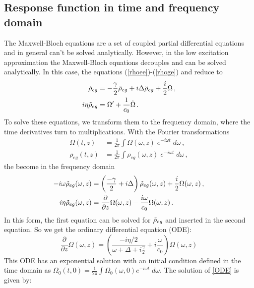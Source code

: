 \subsection{Response function in time and frequency domain}\label{section_respfunction}
The Maxwell-Bloch equations are a set of coupled partial differential equations and in general can't be solved analytically. However, in the low excitation approximation the Maxwell-Bloch equations decouples and can be solved analytically. In this case, the equations (\ref{rhoee})-(\ref{rhoge}) and  reduce to
\begin{align}
    \dot{\rho}_{eg} &= -\frac{\gamma}{2} \Tilde{\rho}_{eg} + i\Delta \Tilde{\rho}_{eg} + \frac{i}{2} \Omega \, , \label{rhoegpre}\\
    i\eta \Tilde{\rho}_{eg} &= \Omega' + \frac{1}{c_0} \dot{\Omega} \, .\label{Omegapre}
\end{align}
To solve these equations, we transform them to the frequency domain, where the time derivatives turn to multiplications. With the Fourier transformations
\begin{align}
    \Omega(t,z) &= \frac{1}{2\pi} \int \Omega(\omega,z)\; e^{-i\omega t} \;d\omega \, , \label{fourierdef}\\
    \rho_{eg}(t,z) &= \frac{1}{2\pi} \int \rho_{eg}(\omega,z)\; e^{-i\omega t}\; d\omega\, ,
\end{align}
the  become in the frequency domain
\begin{align}
    -i\omega \Tilde{\rho}_{eg}(\omega, z) &= \left(\frac{-\gamma}{2} + i\Delta \right)\Tilde{\rho}_{eg} (\omega,z) + \frac{i}{2} \Omega(\omega, z) \label{timerhoegpre}\, , \\
    i\eta \Tilde{\rho}_{eg}(\omega, z) &= \frac{\partial}{\partial z} \Omega(\omega, z) - \frac{i\omega}{c_0} \Omega(\omega, z) \, .\label{timeomegapre}
\end{align}
In this form, the first equation can be solved for $\Tilde{\rho}_{eg}$ and inserted in the second equation. So we get the ordinary differential equation (ODE):
\begin{equation}
    \frac{\partial}{\partial z} \Omega(\omega,z) = \left(\frac{-i \eta /2}{\omega + \Delta + i \frac{\gamma}{2}}  + i \frac{\omega}{c_0}\right) \Omega(\omega,z) \label{ODE}
\end{equation}
This ODE has an exponential solution with an initial condition defined in the time domain as $\Omega_0(t,0) = \frac{1}{2\pi} \int \Omega_0(\omega,0) e^{-i\omega t} \;d\omega$. The solution of \cref{ODE} is given by:

